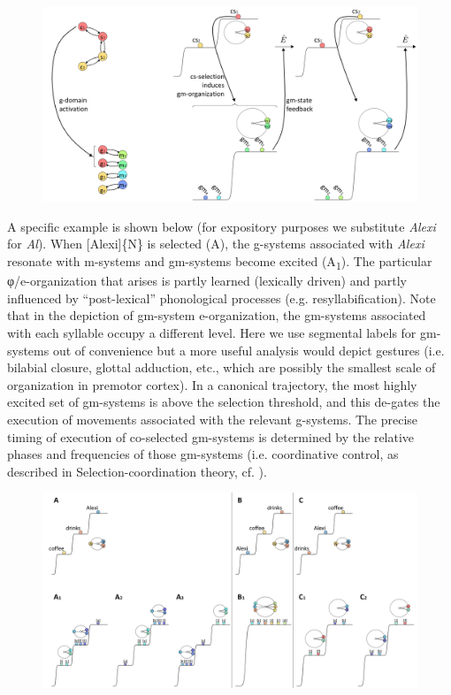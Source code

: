  
\begin{figure}
\includegraphics[width=\textwidth]{figures/Tilsen-img54.png}
\caption{\missingcaption}
\label{fig:4:4}
\end{figure}
 

  A specific example is shown below (for expository purposes we substitute \textit{Alexi} for \textit{Al}). When [Alexi]\{N\} is selected (A), the g-systems associated with \textit{Alexi} resonate with m-systems and gm-systems become excited (A\textsubscript{1}). The particular φ/e-organization that arises is partly learned (lexically driven) and partly influenced by “post-lexical” phonological processes (e.g. resyllabification). Note that in the depiction of gm-system e-organization, the gm-systems associated with each syllable occupy a different level. Here we use segmental labels for gm-systems out of convenience but a more useful analysis would depict gestures (i.e. bilabial closure, glottal adduction, etc., which are possibly the smallest scale of organization in premotor cortex). In a canonical trajectory, the most highly excited set of gm-systems is above the selection threshold, and this de-gates the execution of movements associated with the relevant g-systems. The precise timing of execution of co-selected gm-systems is determined by the relative phases and frequencies of those gm-systems (i.e. coordinative control, as described in Selection-coordination theory, cf. \citealt{Tilsen2016,Tilsen2018}). 

  
\begin{figure}
\includegraphics[width=\textwidth]{figures/Tilsen-img55.png}
\caption{\missingcaption}
\label{fig:4:5}
\end{figure}
 


